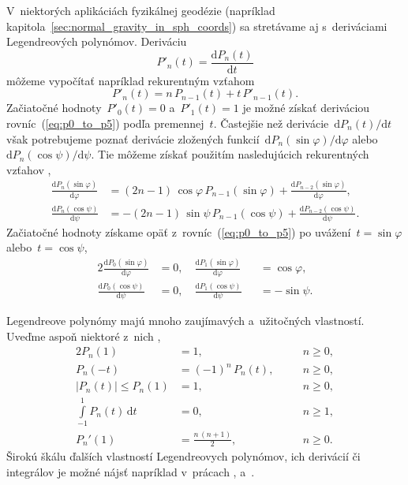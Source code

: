 \documentclass[a4paper, 12pt]{book}
\newcommand{\diff}{\mathrm d}
\begin{document}
V~niektorých aplikáciách fyzikálnej geodézie (napríklad 
kapitola~\ref{sec:normal_gravity_in_sph_coords}) sa stretávame aj s~deriváciami 
Legendreových polynómov.  Deriváciu
%
\begin{equation}
P'_n(t) = \frac{\diff P_n(t)}{\diff t}
\end{equation}
%
môžeme vypočítať napríklad rekurentným vzťahom \parencite{Freeden2009}
%
\begin{equation}
P'_n(t) = n \, P_{n - 1}(t) + t \, P'_{n - 1}(t){.}
\end{equation}
%
Začiatočné hodnoty~$P'_0(t) = 0$ a~$P'_1(t) = 1$ je možné získať deriváciou 
rovníc~(\ref{eq:p0_to_p5}) podľa premennej~$t$.  Častejšie než derivácie~$\diff 
P_n(t) \slash \diff t$ však potrebujeme poznať derivácie zložených 
funkcií~$\diff P_n(\sin\varphi) \slash \diff \varphi$ alebo~$\diff 
P_n(\cos\psi) \slash \diff \psi$.  Tie môžeme získať použitím nasledujúcich 
rekurentných vzťahov \parencite{Tscherning1976b},
%
\begin{align}
\label{eq:dlpsinphi_dphi}
\frac{\diff P_n(\sin\varphi)}{\diff \varphi} &= (2n - 1) \, \cos\varphi \, P_{n 
- 1}(\sin\varphi) + \frac{\diff P_{n - 2}(\sin\varphi)}{\diff \varphi}{,}\\
%
\label{eq:dlpcospsi_dpsi}
\frac{\diff P_n(\cos\psi)}{\diff \psi} &= -(2n - 1) \, \sin\psi \, P_{n 
- 1}(\cos\psi) + \frac{\diff P_{n - 2}(\cos\psi)}{\diff \psi}{.}
\end{align}
%
Začiatočné hodnoty získame opäť z~rovníc~(\ref{eq:p0_to_p5}) po uvážení~$t 
= \sin\varphi$ alebo~$t = \cos\psi$,
%
\begin{alignat}{2}
\frac{\diff P_0(\sin\varphi)}{\diff \varphi} &= 0{,} \quad \frac{\diff 
P_1(\sin\varphi)}{\diff \varphi} &&= \cos\varphi{,}\\
%
\frac{\diff P_0(\cos\psi)}{\diff \psi} &= 0{,} \quad \frac{\diff 
P_1(\cos\psi)}{\diff \psi} &&= -\sin\psi{.}
\end{alignat}

Legendreove polynómy majú mnoho zaujímavých a~užitočných vlastností.  Uveďme 
aspoň niektoré z~nich \parencite{Freeden2009},
%
\begin{alignat}{2}
\label{eq:pn_property1}
P_n(1) &= 1{,} && \quad n \geq 0{,}\\
%
\label{eq:pn_property2}
P_n(-t) &= (-1)^n \, P_n(t){,} && \quad n \geq 0{,}\\
%
\label{eq:pn_property3}
|P_n(t)| \leq P_n(1) &= 1{,} && \quad n \geq 0{,}\\
%
\int\limits_{-1}^{1} P_n(t) \, \diff t &= 0{,} && \quad n \geq 1{,}\\
%
\label{eq:pn_property4}
P_n'(1) &= \frac{n \, (n + 1)}{2}{,} && \quad n \geq 0{.}
\end{alignat}
%
Širokú škálu ďalších vlastností Legendreovych polynómov, ich derivácií či 
integrálov je možné nájsť napríklad v~prácach \textcite{Gradshteyn2007}, 
\textcite{Freeden2009} a~\textcite{Olver2010}.
\end{document}
